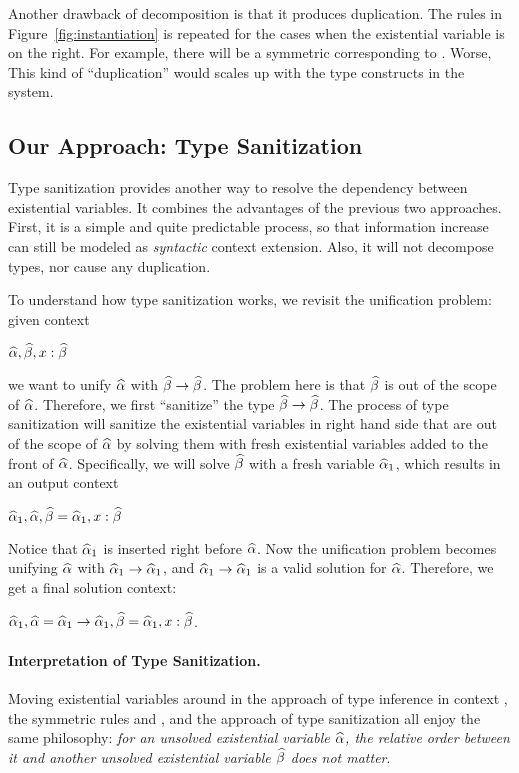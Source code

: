 Another drawback of decomposition is that it produces duplication. The rules in
Figure~\ref{fig:instantiation} is repeated for the cases when the existential
variable is on the right. For example, there will be a symmetric 
corresponding to . Worse, This kind of ``duplication'' would
scales up with the type constructs in the system.

\subsection{Our Approach: Type Sanitization}
\label{subsec:sanitization}

Type sanitization provides another way to resolve the dependency between existential
variables. It combines the advantages of the previous two approaches. First, it is a
simple and quite predictable process, so that information increase can still be
modeled as \textit{syntactic} context extension. Also, it will not decompose
types, nor cause any duplication.

To understand how type sanitization works, we revisit the unification
problem: given context

$\widehat{\alpha}, \widehat{\beta}, x: \widehat{\beta}$

\noindent we want to unify $\widehat{\alpha}$ with $\widehat{\beta} \to \widehat{\beta}$. The problem here is
that $\widehat{\beta}$ is out of the scope of $\widehat{\alpha}$. Therefore, we first ``sanitize''
the type $\widehat{\beta} \to \widehat{\beta}$. The process of type sanitization will sanitize the
existential variables in right hand side that are out of the scope of $\widehat{\alpha}$ by
solving them with fresh existential variables added to the front of $\widehat{\alpha}$.
Specifically, we will solve
$\widehat{\beta}$ with a fresh variable $\widehat{\alpha}_1$, which results in an output context

$\widehat{\alpha}_1, \widehat{\alpha}, \widehat{\beta} = \widehat{\alpha}_1, x: \widehat{\beta}$

Notice that $\widehat{\alpha}_1$ is inserted right before $\widehat{\alpha}$. Now the unification
problem becomes unifying $\widehat{\alpha}$ with $\widehat{\alpha}_1 \to \widehat{\alpha}_1$, and $\widehat{\alpha}_1 \to
\widehat{\alpha}_1$ is a valid solution for $\widehat{\alpha}$. Therefore, we get a final solution
context:

$\widehat{\alpha}_1, \widehat{\alpha} = \widehat{\alpha}_1 \to \widehat{\alpha}_1, \widehat{\beta} = \widehat{\alpha}_1, x : \widehat{\beta}$.


\paragraph{Interpretation of Type Sanitization.}
Moving existential variables around in the approach of type inference in context
\citep{gundry2010type}, the symmetric rules  and
 \citep{dunfield2013complete}, and the approach of type
sanitization all enjoy the same philosophy: \textit{for an unsolved existential
  variable $\widehat{\alpha}$, the relative order between it and another unsolved
  existential variable $\widehat{\beta}$ does not matter}. 

